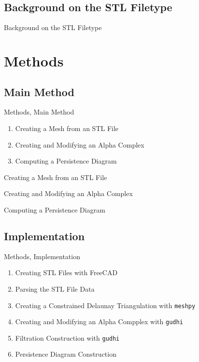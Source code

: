 \documentclass[xcolor=dvipsnames, aspectratio=169]{beamer}
\begin{document}
\subsection{Background on the STL Filetype}
\begin{frame}{Background on the STL Filetype}

\end{frame}

\section{Methods}
\subsection{Main Method}
\begin{frame}{Methods, Main Method}
\begin{enumerate}
\item Creating a Mesh from an STL File
\item Creating and Modifying an Alpha Complex
\item Computing a Persistence Diagram
\end{enumerate}
\end{frame}

\begin{frame}{Creating a Mesh from an STL File}

\end{frame}

\begin{frame}{Creating and Modifying an Alpha Complex}

\end{frame}

\begin{frame}{Computing a Persistence Diagram}

\end{frame}

\subsection{Implementation}
\begin{frame}[fragile]{Methods, Implementation}
\begin{enumerate}
\item Creating STL Files with FreeCAD
\item Parsing the STL File Data
\item Creating a Constrained Delaunay Triangulation with \verb"meshpy"
\item Creating and Modifying an Alpha Compplex with \verb"gudhi"
\item Filtration Construction with \verb"gudhi"
\item Persistence Diagram Construction
\end{enumerate}
\end{frame}
\end{document}
